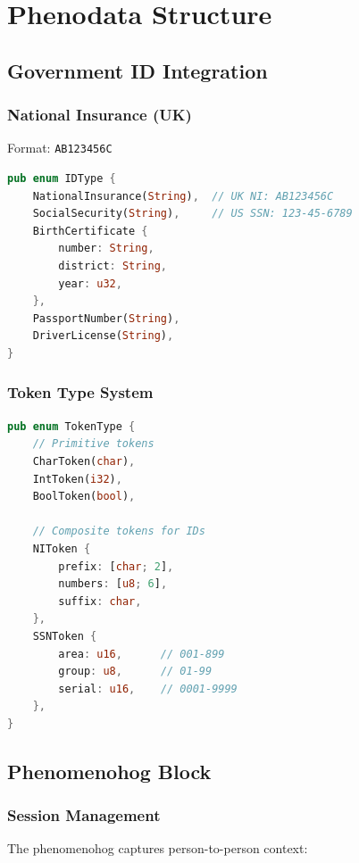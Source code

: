 \documentclass[12pt,a4paper]{report}
\theoremstyle{definition}
\begin{document}
\chapter{Phenodata Structure}

\section{Government ID Integration}

\subsection{National Insurance (UK)}

Format: \texttt{AB123456C}

\begin{lstlisting}[language=Rust, caption=NI Token Structure]
pub enum IDType {
    NationalInsurance(String),  // UK NI: AB123456C
    SocialSecurity(String),     // US SSN: 123-45-6789
    BirthCertificate {
        number: String,
        district: String,
        year: u32,
    },
    PassportNumber(String),
    DriverLicense(String),
}
\end{lstlisting}

\subsection{Token Type System}

\begin{lstlisting}[language=Rust, caption=Token Type Definition]
pub enum TokenType {
    // Primitive tokens
    CharToken(char),
    IntToken(i32),
    BoolToken(bool),
    
    // Composite tokens for IDs
    NIToken {
        prefix: [char; 2],
        numbers: [u8; 6],
        suffix: char,
    },
    SSNToken {
        area: u16,      // 001-899
        group: u8,      // 01-99
        serial: u16,    // 0001-9999
    },
}
\end{lstlisting}

\section{Phenomenohog Block}

\subsection{Session Management}

The phenomenohog captures person-to-person context:
\end{document}
